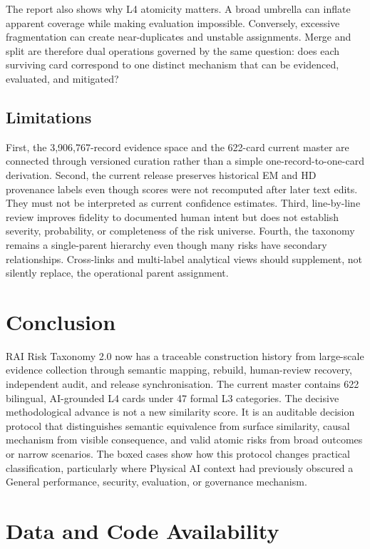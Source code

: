 \documentclass[10pt,a4paper]{article}
\begin{document}
The report also shows why L4 atomicity matters. A broad umbrella can inflate apparent coverage while making evaluation impossible. Conversely, excessive fragmentation can create near-duplicates and unstable assignments. Merge and split are therefore dual operations governed by the same question: does each surviving card correspond to one distinct mechanism that can be evidenced, evaluated, and mitigated?

\subsection{Limitations}

First, the 3,906,767-record evidence space and the 622-card current master are connected through versioned curation rather than a simple one-record-to-one-card derivation. Second, the current release preserves historical EM and HD provenance labels even though scores were not recomputed after later text edits. They must not be interpreted as current confidence estimates. Third, line-by-line review improves fidelity to documented human intent but does not establish severity, probability, or completeness of the risk universe. Fourth, the taxonomy remains a single-parent hierarchy even though many risks have secondary relationships. Cross-links and multi-label analytical views should supplement, not silently replace, the operational parent assignment.

\section{Conclusion}

RAI Risk Taxonomy 2.0 now has a traceable construction history from large-scale evidence collection through semantic mapping, rebuild, human-review recovery, independent audit, and release synchronisation. The current master contains 622 bilingual, AI-grounded L4 cards under 47 formal L3 categories. The decisive methodological advance is not a new similarity score. It is an auditable decision protocol that distinguishes semantic equivalence from surface similarity, causal mechanism from visible consequence, and valid atomic risks from broad outcomes or narrow scenarios. The boxed cases show how this protocol changes practical classification, particularly where Physical AI context had previously obscured a General performance, security, evaluation, or governance mechanism.

\section*{Data and Code Availability}
\end{document}
